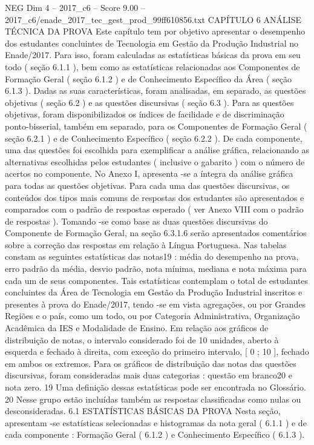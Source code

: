 \begin{textsample}{NEG Dim 4 – 2017\_c6 – Score 9.00 – 2017\_c6/enade\_2017\_tec\_gest\_prod\_99ff610856.txt}  \label{ex:f4_neg_324}
CAPÍTULO 6 ANÁLISE TÉCNICA DA PROVA Este capítulo tem por objetivo apresentar o desempenho dos estudantes concluintes de Tecnologia em Gestão da Produção Industrial no Enade/2017.
Para isso, foram calculadas as estatísticas básicas da prova em seu todo ( seção 6.1.1 ), bem como as estatísticas relacionadas aos Componentes de Formação Geral ( seção 6.1.2 ) e de Conhecimento Específico da Área ( seção 6.1.3 ).
Dadas as suas características, foram analisadas, em separado, as questões objetivas ( seção 6.2 ) e as questões discursivas ( seção 6.3 ).
Para as questões objetivas, foram disponibilizados os índices de facilidade e de discriminação ponto-bisserial, também em separado, para os Componentes de Formação Geral ( seção 6.2.1 ) e de Conhecimento Específico ( seção 6.2.2 ).
De cada componente, uma das questões foi escolhida para exemplificar a análise gráfica, relacionando as alternativas escolhidas pelos estudantes ( inclusive o gabarito ) com o número de acertos no componente.
No Anexo I, apresenta -se a íntegra da análise gráfica para todas as questões objetivas.
Para cada uma das questões discursivas, os conteúdos dos tipos mais comuns de respostas dos estudantes são apresentados e comparados com o padrão de respostas esperado ( ver Anexo VIII com o padrão de respostas ).
Tomando -se como base as duas questões discursivas do Componente de Formação Geral, na seção 6.3.1.6 serão apresentados comentários sobre a correção das respostas em relação à Língua Portuguesa.
Nas tabelas constam as seguintes estatísticas das notas19 : média do desempenho na prova, erro padrão da média, desvio padrão, nota mínima, mediana e nota máxima para cada um de seus componentes.
Tais estatísticas contemplam o total de estudantes concluintes da Área de Tecnologia em Gestão da Produção Industrial inscritos e presentes à prova do Enade/2017, tendo -se em vista agregações, ou por Grandes Regiões e o país, como um todo, ou por Categoria Administrativa, Organização Acadêmica da IES e Modalidade de Ensino.
Em relação aos gráficos de distribuição de notas, o intervalo considerado foi de 10 unidades, aberto à esquerda e fechado à direita, com exceção do primeiro intervalo, [ 0 ; 10 ], fechado em ambos os extremos.
Para os gráficos de distribuição das notas das questões discursivas, foram consideradas mais duas categorias : questão em branco20 e nota zero. 19 Uma definição dessas estatísticas pode ser encontrada no Glossário. 20 Nesse grupo estão incluídas também as respostas classificadas como nulas ou desconsideradas. 6.1 ESTATÍSTICAS BÁSICAS DA PROVA Nesta seção, apresentam -se estatísticas selecionadas e histogramas da nota geral ( 6.1.1 ) e de cada componente : Formação Geral ( 6.1.2 ) e Conhecimento Específico ( 6.1.3 ).

\end{textsample}
